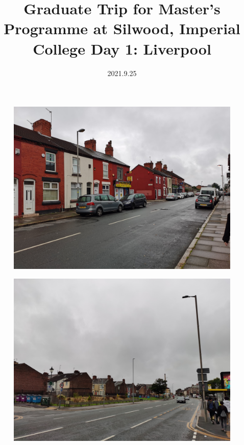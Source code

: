 \documentclass[11pt]{article}
\title{Graduate Trip for Master's Programme at Silwood, Imperial College \newline Day 1: Liverpool}
\date{2021.9.25}
\begin{document}
  \maketitle
  
  \newpage

  \linenumbers

\begin{figure}[H]
    \centering
    \includegraphics[width=\textwidth]{1A.jpg}
\end{figure}

\begin{figure}[H]
    \centering
    \includegraphics[width=\textwidth]{1B.jpg}
\end{figure}
\end{document}
